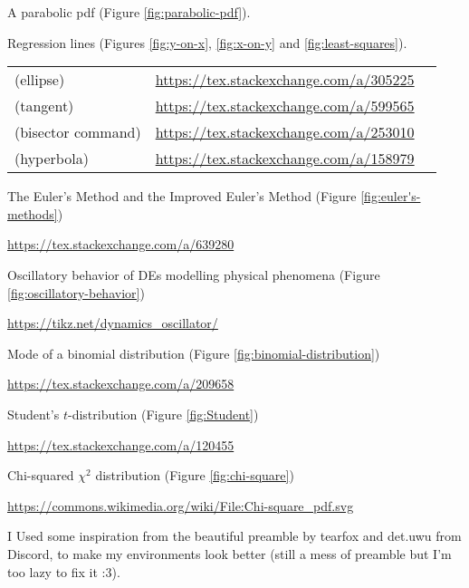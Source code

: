 \begin{enumerate}[label={[\arabic*]}]
  A parabolic pdf (Figure \ref{fig:parabolic-pdf}). 
  
  Regression lines (Figures \ref{fig:y-on-x}, \ref{fig:x-on-y} and \ref{fig:least-squares}).

  \begin{tabular}{lSc}
    (ellipse) & \url{https://tex.stackexchange.com/a/305225}\\
    (tangent) & \url{https://tex.stackexchange.com/a/599565}\\
    (bisector command) & \url{https://tex.stackexchange.com/a/253010}\\
    (hyperbola) & \url{https://tex.stackexchange.com/a/158979}
  \end{tabular}
  \item\label{source:euler's-methods} The Euler's Method and the Improved Euler's Method (Figure \ref{fig:euler's-methods})
  
  \url{https://tex.stackexchange.com/a/639280}
  \item\label{source:oscillatory-behavior} Oscillatory behavior of DEs modelling physical phenomena (Figure \ref{fig:oscillatory-behavior})
  
  \url{https://tikz.net/dynamics_oscillator/}
  \item\label{source:binomial-distribution} Mode of a binomial distribution (Figure \ref{fig:binomial-distribution})

  \url{https://tex.stackexchange.com/a/209658}
  \item\label{source:Student} Student's \(t\)-distribution (Figure \ref{fig:Student})

  \url{https://tex.stackexchange.com/a/120455}
  \item\label{source:chi-squared} Chi-squared \(\chi^2\) distribution (Figure \ref{fig:chi-square})

  \url{https://commons.wikimedia.org/wiki/File:Chi-square_pdf.svg}
  \item I Used some inspiration from the beautiful preamble by tearfox and det.uwu from Discord, to make my environments look better (still a mess of preamble but I'm too lazy to fix it :3).
\end{enumerate}